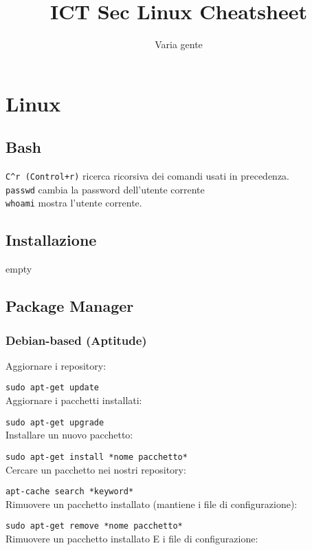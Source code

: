 \documentclass[]{report}
\title{ICT Sec Linux Cheatsheet}
\author{Varia gente}
\begin{document}
\maketitle
\tableofcontents

\chapter{Linux}
\section{Bash}
\verb|C^r (Control+r)| ricerca ricorsiva dei comandi usati in precedenza.\\

\noindent \verb|passwd| cambia la password dell'utente corrente\\

\noindent \verb|whoami| mostra l'utente corrente.
\section{Installazione}
empty
\newpage
\section{Package Manager}
\subsection{Debian-based (Aptitude)}
\noindent Aggiornare i repository:

\verb|sudo apt-get update|\\

\noindent Aggiornare i pacchetti installati:

\verb|sudo apt-get upgrade|\\

\noindent Installare un nuovo pacchetto:

\verb|sudo apt-get install *nome pacchetto*|\\

\noindent Cercare un pacchetto nei nostri repository:

\verb|apt-cache search *keyword*|\\

\noindent Rimuovere un pacchetto installato (mantiene i file di configurazione):

\verb|sudo apt-get remove *nome pacchetto*|\\

\noindent Rimuovere un pacchetto installato E i file di configurazione:
\end{document}
